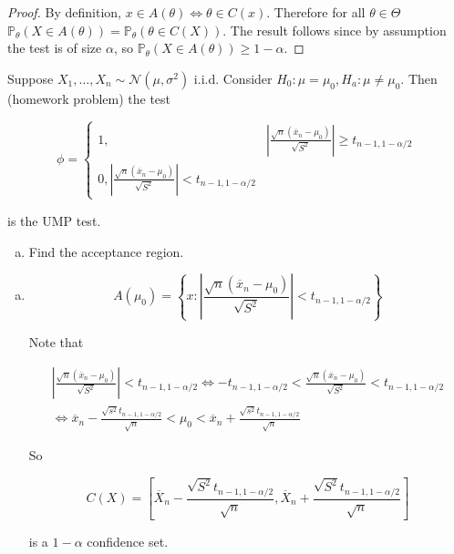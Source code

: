 \begin{proof}

By definition, \(x \in A(\theta) \iff \theta \in C(x)\). Therefore for all \(\theta \in \Theta\) \(\mathbb{P}_\theta (X \in A(\theta) ) = \mathbb{P}_\theta (\theta \in C(X))\). The result follows since by assumption the test is of size \(\alpha\), so \(\mathbb{P}_\theta (X \in A(\theta) ) \geq 1 - \alpha\).

\end{proof}

\begin{example}

Suppose \(X_1, \ldots, X_n \sim \mathcal{N}(\mu, \sigma^2)\) i.i.d. Consider \(H_0: \mu = \mu_0, H_a: \mu \neq \mu_0\). Then (homework problem) the test

\[
\phi = \begin{cases}
1, & \left| \frac{ \sqrt{n}(\overline{x}_n - \mu_0) }{\sqrt{S^2}} \right| \geq t_{n - 1, 1-\alpha/2} \\
0,  \left| \frac{ \sqrt{n}(\overline{x}_n - \mu_0) }{\sqrt{S^2}} \right| < t_{n - 1, 1-\alpha/2} & 
\end{cases}
\]

is the UMP test. 

\begin{enumerate}[(a)]

\item

Find the acceptance region.

\end{enumerate}
\end{example}

\begin{solution}

\begin{enumerate}[(a)]

\item

\[
A(\mu_0) = \left\{ x: \left| \frac{ \sqrt{n}(\overline{x}_n - \mu_0) }{\sqrt{S^2}} \right| < t_{n - 1,1- \alpha/2}  \right\}
\]

Note that

\begin{multline*}
\left| \frac{ \sqrt{n}(\overline{x}_n - \mu_0) }{\sqrt{S^2}} \right| < t_{n - 1,1- \alpha/2}  \iff -  t_{n - 1,1- \alpha/2}  < \frac{ \sqrt{n}(\overline{x}_n - \mu_0) }{\sqrt{S^2}}  <  t_{n - 1,1- \alpha/2} 
\\ \iff \overline{x}_n - \frac{ \sqrt{s^2}   t_{n - 1,1- \alpha/2}}{\sqrt{n}} < \mu_0 < \overline{x}_n + \frac{ \sqrt{s^2}   t_{n - 1,1- \alpha/2}}{\sqrt{n}}
\end{multline*}

So

\[
C(X) = \left[  \overline{X}_n - \frac{ \sqrt{S^2}   t_{n - 1,1- \alpha/2}}{\sqrt{n}} 
,  \overline{X}_n + \frac{ \sqrt{S^2}   t_{n - 1,1- \alpha/2}}{\sqrt{n}} 
\right]
\]

is a \(1 - \alpha\) confidence set.

\end{enumerate}

\end{solution}

